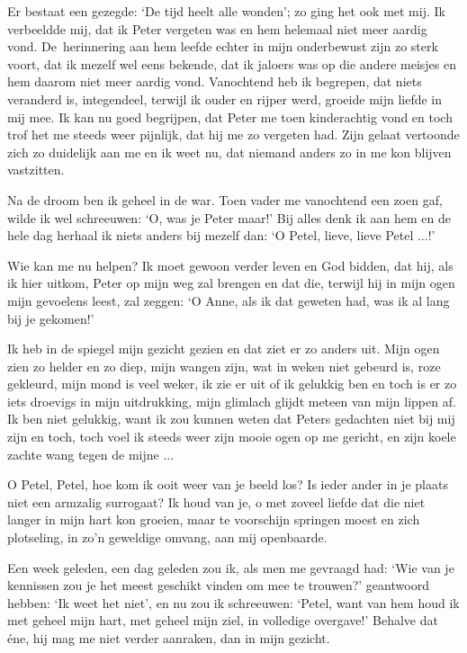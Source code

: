 \documentclass{book}
\begin{document}
Er bestaat een gezegde: `De tijd heelt alle wonden'; zo ging het ook met
mij. Ik verbeeldde mij, dat ik Peter vergeten was en hem helemaal niet
meer aardig vond. De~herinnering aan hem leefde echter in mijn
onderbewust zijn zo sterk voort, dat ik mezelf wel eens bekende, dat ik
jaloers was op die andere meisjes en hem daarom niet meer aardig vond.
Vanochtend heb ik begrepen, dat niets veranderd is, integendeel, terwijl
ik ouder en rijper werd, groeide mijn liefde in mij mee. Ik kan nu goed
begrijpen, dat Peter me toen kinderachtig vond en toch trof het me
steeds weer pijnlijk, dat hij me zo vergeten had. Zijn gelaat vertoonde
zich zo duidelijk aan me en ik weet nu, dat niemand anders zo in me kon
blijven vastzitten.

Na de droom ben ik geheel in de war. Toen vader me vanochtend een zoen
gaf, wilde ik wel schreeuwen: `O, was je Peter maar!' Bij alles denk ik
aan hem en de hele dag herhaal ik niets anders bij mezelf dan: `O Petel,
lieve, lieve Petel ...!'

Wie kan me nu helpen? Ik moet gewoon verder leven en God bidden, dat
hij, als ik hier uitkom, Peter op mijn weg zal brengen en dat die,
terwijl hij in mijn ogen mijn gevoelens leest, zal zeggen: `O Anne, als
ik dat geweten had, was ik al lang bij je gekomen!'

Ik heb in de spiegel mijn gezicht gezien en dat ziet er zo anders uit.
Mijn ogen zien zo helder en zo diep, mijn wangen zijn, wat in weken niet
gebeurd is, roze gekleurd, mijn mond is veel weker, ik zie er uit of ik
gelukkig ben en toch is er zo iets droevigs in mijn uitdrukking, mijn
glimlach glijdt meteen van mijn lippen af. Ik ben niet gelukkig, want ik
zou kunnen weten dat Peters gedachten niet bij mij zijn en toch, toch
voel ik steeds weer zijn mooie ogen op me gericht, en zijn koele zachte
wang tegen de mijne ...

O Petel, Petel, hoe kom ik ooit weer van je beeld los? Is ieder ander in
je plaats niet een armzalig surrogaat? Ik houd van je, o met zoveel
liefde dat die niet langer in mijn hart kon groeien, maar te voorschijn
springen moest en zich plotseling, in zo'n geweldige omvang, aan mij
openbaarde.

Een week geleden, een dag geleden zou ik, als men me gevraagd had: `Wie
van je kennissen zou je het meest geschikt vinden om mee te trouwen?'
geantwoord hebben: `Ik weet het niet', en nu zou ik schreeuwen: `Petel,
want van hem houd ik met geheel mijn hart, met geheel mijn ziel, in
volledige overgave!' Behalve dat éne, hij mag me niet verder aanraken,
dan in mijn gezicht.
\end{document}
